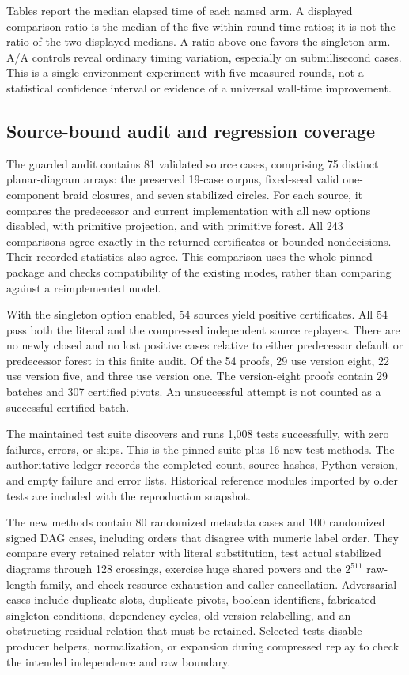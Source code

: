 Tables report the median elapsed time of each named arm. A displayed
comparison ratio is the median of the five within-round time ratios;
it is not the ratio of the two displayed medians. A ratio above one favors
the singleton arm. A/A controls reveal ordinary timing variation, especially
on submillisecond cases. This is a single-environment experiment with five
measured rounds, not a statistical confidence interval or evidence of a
universal wall-time improvement.

\subsection{Source-bound audit and regression coverage}

The guarded audit contains 81 validated source cases, comprising 75 distinct
planar-diagram arrays: the preserved
19-case corpus, fixed-seed valid one-component braid closures, and seven
stabilized circles. For each source, it compares the predecessor and current
implementation with all new options disabled, with primitive projection,
and with primitive forest. All 243 comparisons agree exactly in the returned
certificates or bounded nondecisions. Their recorded statistics also agree.
This comparison uses the whole pinned package and checks compatibility
of the existing modes, rather than comparing against a reimplemented model.

With the singleton option enabled, 54 sources yield positive certificates.
All 54 pass both the literal and the compressed independent source replayers.
There are no newly closed and no lost positive cases relative to either
predecessor default or predecessor forest in this finite audit. Of the 54
proofs, 29 use version eight, 22 use version five, and three use version one.
The version-eight proofs contain 29 batches and 307 certified pivots.
An unsuccessful attempt is not counted as a successful certified batch.

The maintained test suite discovers and runs 1,008 tests successfully, with
zero failures, errors, or skips. This is the pinned suite plus 16 new test
methods. The authoritative ledger records the completed count, source hashes,
Python version, and empty failure and error lists. Historical reference
modules imported by older tests are included with the reproduction snapshot.

The new methods contain 80 randomized metadata cases and 100 randomized
signed DAG cases, including orders that disagree with numeric label order.
They compare every retained relator with literal substitution, test actual
stabilized diagrams through 128 crossings, exercise huge shared powers and
the $2^{511}$ raw-length family, and check resource exhaustion and caller
cancellation. Adversarial cases include duplicate slots, duplicate pivots,
boolean identifiers, fabricated singleton conditions, dependency cycles,
old-version relabelling, and an obstructing residual relation that must be retained.
Selected tests disable producer helpers, normalization, or expansion during
compressed replay to check the intended independence and raw boundary.

